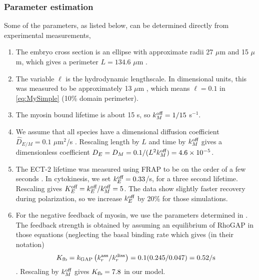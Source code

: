 \documentclass[11pt]{article}
\begin{document}
\begin{appendix}
\subsubsection{Parameter estimation}
Some of the parameters, as listed below, can be determined directly from experimental measurements, 
\begin{enumerate}
\item The embryo cross section is an ellipse with approximate radii 27 $\mu$m and 15 $\mu$m, which gives a perimeter $L=134.6$ $\mu$m \citep{goehring2011polarization} .
\item The variable $\ell$ is the hydrodynamic lengthscale. In dimensional units, this was measured to be approximately 13 $\mu$m \citep{mayer2010anisotropies}, which means $\ell = 0.1$ in \eqref{eq:MySimple} (10\% domain perimeter).  
\item The myosin bound lifetime is about 15 s, so $k^\text{off}_M=1/15$ s$^{-1}$.
\item We assume that all species have a dimensional diffusion coefficient $\hat D_{E/M}=0.1$ $\mu$m$^2$/s \citep{goehring2011polarization, gross2019guiding, robin2014single}. Rescaling length by $L$ and time by $k^\text{off}_M$ gives a dimensionless coefficient $D_E=D_M=0.1/(L^2 k^\text{off}_M)=4.6 \times 10^{-5}$. 
\item The ECT-2 lifetime was measured using FRAP to be on the order of a few seconds \citep[Fig.~3D]{longhini2022aurora}. In cytokinesis, we set $k^\text{off}_E=0.33$/s, for a three second lifetime. Rescaling gives $K^\text{off}_E=k^\text{off}_E/k^\text{off}_M=5$. The data show slightly faster recovery during polarization, so we increase $k^\text{off}_E$ by 20\% for those simulations.
\item For the negative feedback of myosin, we use the parameters determined in \citep{michaux2018excitable}. The feedback strength is obtained by assuming an equilibrium of RhoGAP in those equations (neglecting the basal binding rate which gives (in their notation) $$K_\text{fb}=k_\text{GAP}\left(k_r^\text{ass}/k_r^\text{diss}\right)=0.1(0.245/0.047)=0.52\text{/s}$$. Rescaling by $k^\text{off}_M$ gives $K_\text{fb}=7.8$ in our model. 

\end{enumerate}
\end{appendix}
\end{document}
